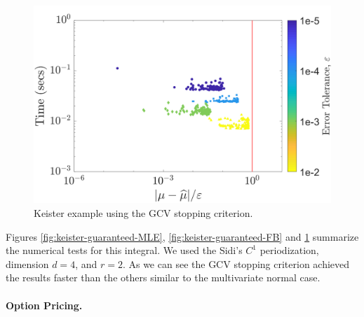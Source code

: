 \documentclass[twocolumn]{svjour3}          %
\begin{document}
\begin{figure}
	\centering
	\includegraphics[width=0.95\linewidth]{"Keister_guaranteed_time_GCV_C1sin_d4_r2_2018-Sep-6"}
	\caption[Keister guaranteed:GCV]{Keister example using the GCV stopping criterion.}
	\label{fig:keister-guaranteed-GCV}
\end{figure}

Figures \ref{fig:keister-guaranteed-MLE}, \ref{fig:keister-guaranteed-FB} and \ref{fig:keister-guaranteed-GCV} summarize the numerical tests for this integral.  We used the Sidi's $C^1$ periodization, dimension $d=4$, and $r=2$. 
As we can see the GCV stopping criterion achieved the results faster than the others similar to the multivariate normal case.

\paragraph{Option Pricing.}
\end{document}
